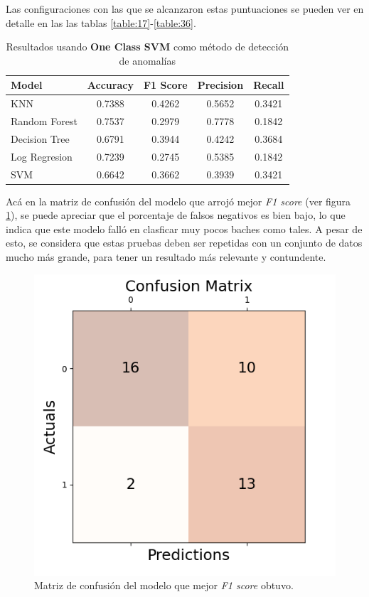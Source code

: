 	Las configuraciones con las que se alcanzaron estas puntuaciones se pueden ver en detalle en las las tablas \ref{table:17}-\ref{table:36}.

	\newpage
	\begin{table}[htb]
		\centering
		\caption{Resultados usando \textbf{One Class SVM} como método de detección de anomalías}
		\label{table:16}
		\begin{tabular}{lcccc}
		\toprule
				Model &  Accuracy &  F1 Score &  Precision &  Recall \\
		\midrule
				  KNN &    0.7388 &    0.4262 &     0.5652 &  0.3421 \\
		Random Forest &    0.7537 &    0.2979 &     0.7778 &  0.1842 \\
		Decision Tree &    0.6791 &    0.3944 &     0.4242 &  0.3684 \\
		Log Regresion &    0.7239 &    0.2745 &     0.5385 &  0.1842 \\
				  SVM &    0.6642 &    0.3662 &     0.3939 &  0.3421 \\
		\bottomrule
		\end{tabular}
	\end{table}

	Acá en la matriz de confusión del modelo que arrojó mejor \emph{F1 score} (ver figura \ref{fig:13}), se puede apreciar que el porcentaje de falsos
	negativos es bien bajo, lo que indica que este modelo falló en clasficar muy pocos baches como tales. A pesar de esto, se considera que estas pruebas 
	deben ser repetidas con un conjunto de datos mucho más grande, para tener un resultado más relevante y contundente.

	\begin{figure}[htb]
		\centering
		\includegraphics[scale = 0.6]{Graphics/best_model_confusion_matrix.png}
		\caption{Matriz de confusión del modelo que mejor \emph{F1 score} obtuvo.}
		\label{fig:13}
	\end{figure}

